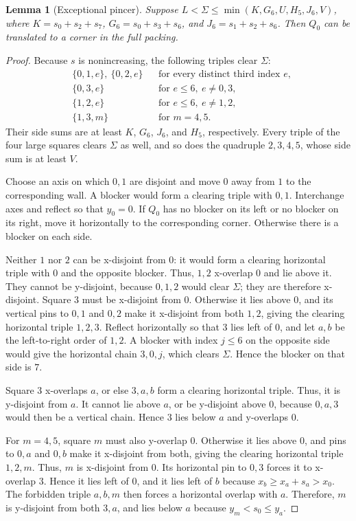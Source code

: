 \documentclass[12pt]{amsart}
\newtheorem{lemma}[theorem]{Lemma}
\theoremstyle{definition}
\theoremstyle{remark}
\numberwithin{equation}{section}
\numberwithin{figure}{section}
\numberwithin{table}{section}
\begin{document}
\begin{lemma}[Exceptional pincer]\label{lem:exceptional}
Suppose $L<\Sigma\le\min(K,G_6,U,H_5,J_6,V)$, where $K=s_0+s_2+s_7$,
$G_6=s_0+s_3+s_6$, and $J_6=s_1+s_2+s_6$. Then $Q_0$ can be translated to a corner in the full packing.
\end{lemma}
\begin{proof}
Because $s$ is nonincreasing, the following triples clear $\Sigma$:
\begin{align*}
&\{0,1,e\},\ \{0,2,e\} &&\text{for every distinct third index }e,\\
&\{0,3,e\} &&\text{for }e\le6,\ e\ne0,3,\\
&\{1,2,e\} &&\text{for }e\le6,\ e\ne1,2,\\
&\{1,3,m\} &&\text{for }m=4,5.
\end{align*}
Their side sums are at least $K$, $G_6$, $J_6$, and $H_5$, respectively.
Every triple of the four large squares clears $\Sigma$ as well, and so does
the quadruple $2,3,4,5$, whose side sum is at least $V$.

Choose an axis on which $0,1$ are disjoint and move $0$ away from $1$
to the corresponding wall. A blocker would form a clearing triple with
$0,1$. Interchange axes and reflect so that $y_0=0$.
If $Q_0$ has no blocker on its left or no blocker on its right, move it
horizontally to the corresponding corner. Otherwise there is a blocker on
each side.

Neither $1$ nor $2$ can be x-disjoint from $0$: it would form a clearing
horizontal triple with $0$ and the opposite blocker. Thus, $1,2$ x-overlap $0$ and lie
above it. They cannot be y-disjoint, because $0,1,2$ would clear $\Sigma$; they
are therefore x-disjoint.
Square $3$ must be x-disjoint from $0$. Otherwise it lies above $0$,
and its vertical pins to $0,1$ and $0,2$ make it x-disjoint from both
$1,2$, giving the clearing horizontal triple $1,2,3$. Reflect horizontally
so that $3$ lies left of $0$, and let $a,b$ be the left-to-right order
of $1,2$. A blocker with index $j\le6$ on the opposite side would give the
horizontal chain $3,0,j$, which clears $\Sigma$.
Hence the blocker on that side is $7$.

Square $3$ x-overlaps $a$, or else $3,a,b$ form a clearing
horizontal triple. Thus, it is y-disjoint from $a$. It cannot lie above
$a$, or be y-disjoint above $0$, because $0,a,3$ would then be a vertical
chain. Hence $3$ lies below $a$ and y-overlaps $0$.

For $m=4,5$, square $m$ must also y-overlap $0$. Otherwise it
lies above $0$, and pins to $0,a$ and $0,b$ make it x-disjoint from both,
giving the clearing horizontal triple $1,2,m$. Thus, $m$ is x-disjoint
from $0$. Its horizontal pin to $0,3$ forces it to x-overlap
$3$. Hence it lies left of $0$, and it lies left of $b$ because
$x_b\ge x_a+s_a>x_0$. The forbidden triple $a,b,m$ then forces a horizontal
overlap with $a$. Therefore, $m$ is y-disjoint from both $3,a$, and lies
below $a$ because $y_m<s_0\le y_a$.


\end{proof}
\end{document}
